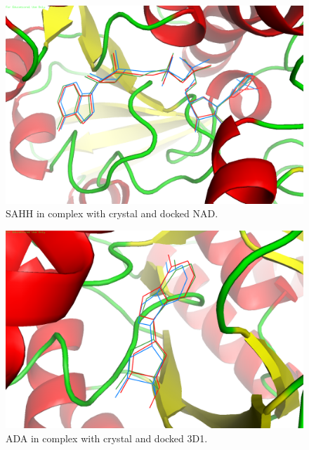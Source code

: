 \begin{figure}
\centering
\includegraphics[width=\textwidth]{VirtualScreening/Figures/1LI4-NAD.png}
\caption{SAHH in complex with crystal and docked NAD.}
\label{fig:1LI4-NAD}
\end{figure}

\begin{figure}
\centering
\includegraphics[width=\textwidth]{VirtualScreening/Figures/3IAR-3D1.png}
\caption{ADA in complex with crystal and docked 3D1.}
\label{fig:3IAR-3D1}
\end{figure}

